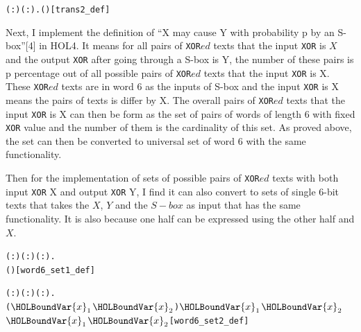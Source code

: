 \documentclass{article}
\begin{document}
\begin{alltt}
  \HOLTokenTurnstile{} \HOLSymConst{\HOLTokenForall{}}( :) ( :).    \HOLSymConst{=} (\HOLSymConst{,} \HOLSymConst{\HOLTokenEor{}} )\hfill{[trans2_def]}
\end{alltt}

Next, I implement the definition of ``X may cause Y with probability p by an S-box''[4] in HOL4. It means for all
pairs of \verb|XOR|$ed$ texts that the input \verb|XOR| is $X$ and the output \verb|XOR| after going through a S-box is Y, the number
of these pairs is p percentage out of all possible pairs of \verb|XOR|$ed$ texts that the input \verb|XOR| is X.
These \verb|XOR|$ed$ texts are in word 6 as the inputs of S-box and the input \verb|XOR| is X means the pairs of
texts is differ by X. The overall pairs of \verb|XOR|$ed$ texts that the input \verb|XOR| is X can then be form as the set of pairs
of words of length 6 with fixed \verb|XOR| value and the number of them is the cardinality of this set. As proved above,
the set can then be converted to universal set of word 6 with the same functionality.

Then for the implementation of sets of possible pairs of \verb|XOR|$ed$ texts with both input \verb|XOR| X and output \verb|XOR| Y,
I find it can also convert to sets of single 6-bit texts that takes the $X$, $Y$ and the $S-box$ as input that has the
same functionality. It is also because one half can be expressed using the other half and $X$.

\begin{alltt}
  \HOLTokenTurnstile{} \HOLSymConst{\HOLTokenForall{}}( :) ( :) ( :).
         \HOLSymConst{=} \HOLTokenLeftbrace{} \HOLTokenBar{}   \HOLSymConst{\HOLTokenEor{}}  ( \HOLSymConst{\HOLTokenEor{}} ) \HOLSymConst{=} \HOLTokenRightbrace{}\hfill{[word6_set1_def]}
\end{alltt}

\begin{alltt}
  \HOLTokenTurnstile{} \HOLSymConst{\HOLTokenForall{}}( :) ( :) ( :).
         \HOLSymConst{=}
     \HOLTokenLeftbrace{}(\ensuremath{\HOLBoundVar{x}\sb{\mathrm{1}}}\HOLSymConst{,}\ensuremath{\HOLBoundVar{x}\sb{\mathrm{2}}}) \HOLTokenBar{} \ensuremath{\HOLBoundVar{x}\sb{\mathrm{1}}} \HOLSymConst{\HOLTokenEor{}} \ensuremath{\HOLBoundVar{x}\sb{\mathrm{2}}} \HOLSymConst{=}  \HOLSymConst{\HOLTokenConj{}}  \ensuremath{\HOLBoundVar{x}\sb{\mathrm{1}}} \HOLSymConst{\HOLTokenEor{}}  \ensuremath{\HOLBoundVar{x}\sb{\mathrm{2}}} \HOLSymConst{=} \HOLTokenRightbrace{}\hfill{[word6_set2_def]}
\end{alltt}
\end{document}
